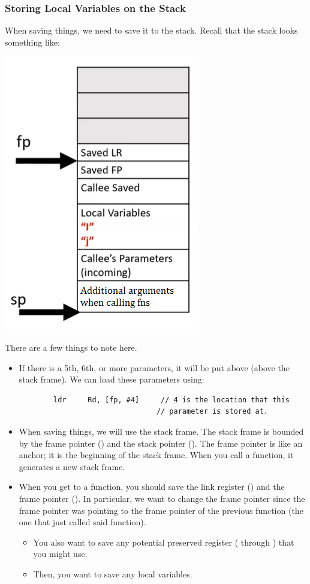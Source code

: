 \documentclass[letterpaper]{article}
\begin{document}
\subsubsection{Storing Local Variables on the Stack}
When saving things, we need to save it to the stack. Recall that the stack looks something like:
\begin{center}
    \includegraphics[scale=0.6]{i2.PNG}
\end{center}
There are a few things to note here.
\begin{itemize}
    \item If there is a 5th, 6th, or more parameters, it will be put above  (above the stack frame). We can load these parameters using:
    \begin{verbatim}
        ldr     Rd, [fp, #4]     // 4 is the location that this 
                                // parameter is stored at. 
    \end{verbatim}
    \item When saving things, we will use the stack frame. The stack frame is bounded by the frame pointer () and the stack pointer (). The frame pointer is like an anchor; it is the beginning of the stack frame. When you call a function, it generates a new stack frame. 
    \item When you get to a function, you should save the link register () and the frame pointer (). In particular, we want to change the frame pointer since the frame pointer was pointing to the frame pointer of the previous function (the one that just called said function). 
    \begin{itemize}
        \item You also want to save any potential preserved register ( through ) that you might use. 
        \item Then, you want to save any local variables. 
    \end{itemize}
\end{itemize}
\end{document}
